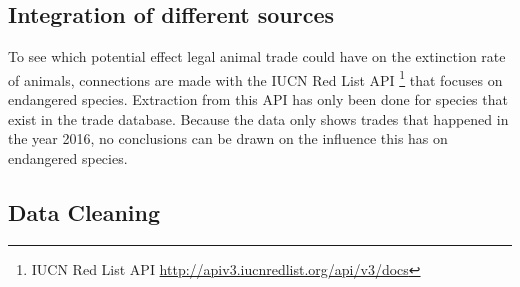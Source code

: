 \subsection{Integration of different sources} \label{sec:source-integration}
To see which potential effect legal animal trade could have on the extinction rate of animals, connections are made with the IUCN Red List API \footnote{IUCN Red List API \url{http://apiv3.iucnredlist.org/api/v3/docs}} that focuses on endangered species. Extraction from this API has only been done for species that exist in the trade database. Because the data only shows trades that happened in the year 2016, no conclusions can be drawn on the influence this has on endangered species.



\subsection{Data Cleaning}


